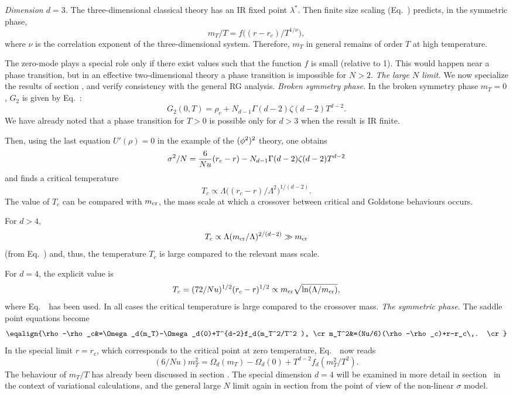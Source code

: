 \smallskip
{\it Dimension  $d=3$.}
The three-dimensional classical theory has an IR fixed point
$\lambda^*$. Then finite size scaling (Eq.~\eFTRGmass) predicts,
in the symmetric phase,
$$ m_T/T= f\bigl((r-r_c)/T^{1/\nu}\bigr),$$
where $\nu$ is the correlation exponent of the three-dimensional
system. Therefore, $m_T$ in general  remains of order $T$ at high
temperature.  \par The zero-mode plays a special role only if
there exist values such that the function $f$ is small (relative
to 1). This would happen near a phase transition, but in an
effective two-dimensional theory a phase transition is impossible
for $N>2$.
%
\medskip
{\it The large $N$ limit.} We now specialize the results of section
\ssNTphig, and verify consistency with the general RG analysis.
\smallskip
{\it Broken symmetry phase.} In the broken symmetry phase $m_T=0$,   $G_2$ is given by Eq.~\eNTGiilow:
$$G_2(0,T)=\rho _c+N_{d-1}\Gamma (d-2)\zeta (d-2) T ^{ d-2}. $$
We have already noted that a phase transition for $T>0$ is possible only for $d>3$ when the result is IR finite. \par
Then, using the last equation $U'(\rho )=0$ in the example of the
$(\phi^2)^2$  theory, one obtains
$$\sigma ^2/N= {6\over Nu}(r_c-r)- N_{d-1}\Gamma (d-2)\zeta (d-2)
T^{d-2} $$
and finds a critical temperature
$$T _c\propto \Lambda \bigl((r_c-r)/\Lambda ^2)^{1/(d-2)}.$$
The value of $T_c$ can be compared with $m_{\rm cr}$, the mass
scale at which a crossover between critical and Goldstone behaviours occurs. \par
For $d>4$,
$$T_c\propto \Lambda (m_{\rm cr}/\Lambda )^{2/(d-2)}\gg m_{\rm cr} $$
 (from Eq.~\eNmcrossc) and, thus, the temperature $T_c$ is large
 compared to the relevant mass scale.
\par For $d=4$, the explicit value is
$$ T _c=(72/Nu)^{1/2}(r_c-r)^{1/2} \propto m_{\rm cr}\sqrt{\ln(\Lambda /m_{\rm cr})},$$
where Eq.~\eNmcrossb\ has been used. In all cases the critical
temperature is large compared to the crossover mass.
\smallskip
{\it The symmetric phase.} The saddle point equations become
$$\eqalign{\rho -\rho _c&=\Omega_d(m_T)-\Omega_d(0)+T^{d-2}f_d(m_T^2/T^2 ), \cr
m_T^2&=(Nu/6)(\rho-\rho_c)+r-r_c\,. \cr}
$$
In the special limit $r=r_c$, which corresponds to the critical point
at zero temperature, Eq.~\eNTUgenmTcrit\ now reads
$$ (6/Nu)m_T^2=\Omega_d(m_T)-\Omega_d(0)+T ^{ d-2}f_d(m_T^2/T^2 ).$$
The behaviour of $m_T/T$ has already been discussed in section \ssNTphig.
The special dimension $d=4$ will be examined in more detail in  section \ssNvarfivT\ in the context of variational calculations, and the general large $N$ limit again in section \label{\ssFTnls}  from the point of view of the non-linear $\sigma $ model.

